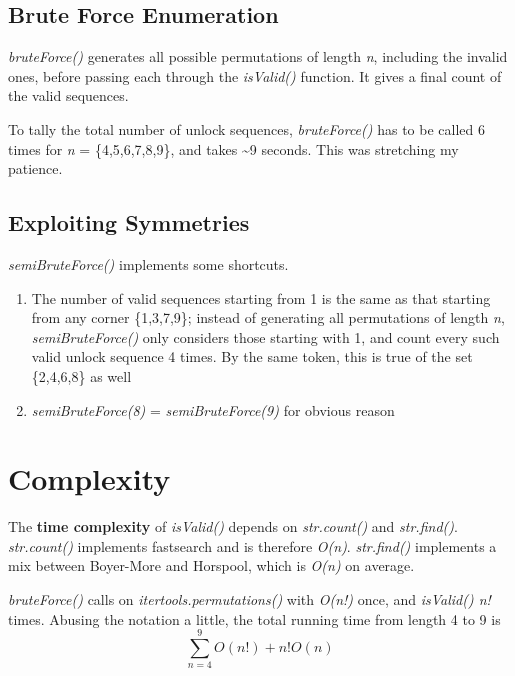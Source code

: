 \documentclass{article}
\begin{document}
\subsection{Brute Force Enumeration} %

\textit{bruteForce()} generates all possible permutations of length \textit{n}, including the invalid ones, before passing each through the \textit{isValid()} function. It gives a final count of the valid sequences.

To tally the total number of unlock sequences, \textit{bruteForce()} has to be called 6 times for \textit{n} = \{4,5,6,7,8,9\}, and takes \textasciitilde9 seconds. This was stretching my patience. 

\subsection{Exploiting Symmetries} %
\textit{semiBruteForce()} implements some shortcuts.
	\begin{enumerate} 
	\itemsep-0.3em 
		\item The number of valid sequences starting from 1 is the same as that starting from any corner \{1,3,7,9\}; instead of generating all permutations of length \textit{n}, \textit{semiBruteForce()} only considers those starting with 1, and count every such valid unlock sequence 4 times. By the same token, this is true of the set \{2,4,6,8\} as well
		\item \textit{semiBruteForce(8)} = \textit{semiBruteForce(9)} for obvious reason
	\end{enumerate}


\section{Complexity} %

The \textbf{time complexity} of \textit{isValid()} depends on \textit{str.count()} and \textit{str.find()}. 
\textit{str.count()} implements fastsearch and is therefore \textit{O(n)}. 
\textit{str.find()} implements a mix between Boyer-More and Horspool, which is \textit{O(n)} on average. 

\textit{bruteForce()} calls on \textit{itertools.permutations()} with \textit{O(n!)} once, and \textit{isValid() n!} times. Abusing the notation a little, the total running time from length 4 to 9 is
\[\sum\limits_{n=4}^9 O(n!)+n!O(n)\]
\end{document}
